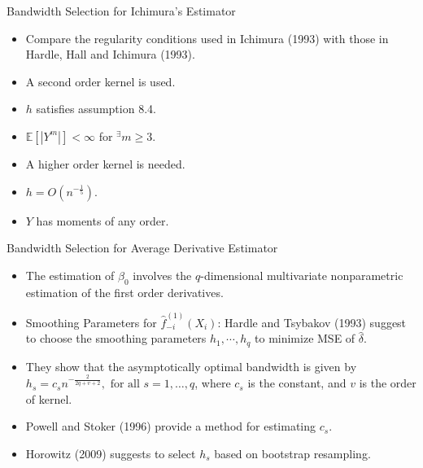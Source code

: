 \documentclass[xcolor=svgnames,dvipdfmx,cjk]{beamer}
\theoremstyle{example}
\def\E{\mathbb{E}}
\begin{document}
\begin{frame}{Bandwidth Selection for Ichimura's Estimator}
  \begin{itemize}
    \item Compare the regularity conditions used in Ichimura (1993) with those in Hardle, Hall and Ichimura (1993).
  \end{itemize}
  \begin{minipage}{0.49\textwidth}  %
    \begin{tcolorbox}[colframe=red!50!white, colback=red!10!white, title=Ichimura (1993)]
        \begin{itemize}
          \item A second order kernel is used.
          \item $h$ satisfies assumption 8.4.
          \item $\E[|Y^m|]<\infty$ for $^\exists m \geq 3$.
        \end{itemize}
    \end{tcolorbox}
  \end{minipage}%
  \hfill
  \begin{minipage}{0.49\textwidth}  %
    \begin{tcolorbox}[colframe=red!50!white, colback=red!10!white, title=HHI (1993)]
        \begin{itemize}
            \item A higher order kernel is needed.
            \item $h = O(n^{-\frac{1}{5}})$.
            \item $Y$ has moments of any order.
        \end{itemize}
    \end{tcolorbox}
  \end{minipage} 
  
\end{frame}

\begin{frame}{Bandwidth Selection for Average Derivative Estimator}
\begin{itemize}
  \item The estimation of $\beta_0$ involves 
        the $q$-dimensional multivariate nonparametric estimation of the first order derivatives.
  \item \alert{Smoothing Parameters for $\hat{f}_{-i}^{(1)}(X_i)$}: 
        Hardle and Tsybakov (1993) suggest 
        to choose the smoothing parameters $h_1, \cdots, h_q$ 
        to minimize MSE of $\hat{\delta}$.
  \item They show that the asymptotically optimal bandwidth is given by 
        $h_s = c_s n^{-\frac{2}{2q+v+2}}, \text{ for all } s = 1, \dots, q$, 
        where $c_s$ is the constant, and $v$ is the order of kernel.
  \item Powell and Stoker (1996) provide a method for estimating $c_s$.
  \item Horowitz (2009) suggests to select $h_s$ based on bootstrap resampling.
\end{itemize}
\end{frame}
\end{document}
